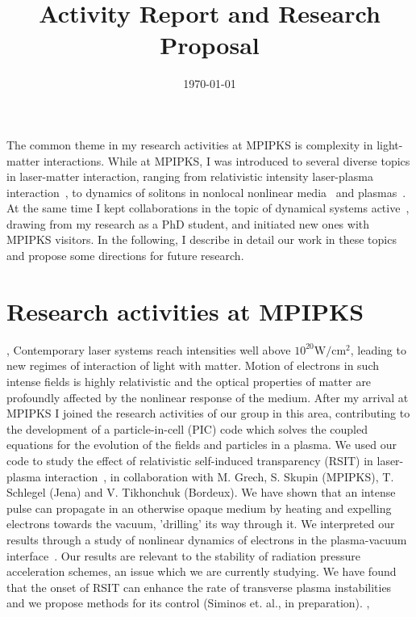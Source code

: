 \documentclass[11pt,a4paper,final]{moderncv}
\title{\large{Activity Report and Research Proposal}}               %
\date{\today}
\begin{document}
\maketitle


The common theme in my research activities at MPIPKS is complexity in light-matter interactions. While at MPIPKS,
I was introduced to several diverse topics in laser-matter interaction,
ranging from relativistic intensity laser-plasma interaction~\cite{siminos2012},
to dynamics of solitons in nonlocal nonlinear media~\cite{maucher2013} and plasmas~\cite{saxena2013}. 
At the same time I kept collaborations in the topic of dynamical systems active~\cite{atlas12}, drawing from
my research as a PhD student, and initiated new ones with MPIPKS visitors.
In the following, I describe in detail our work in these topics and propose some directions
for future research.


\section{Research activities at MPIPKS}
\sep
{}
Contemporary laser systems reach intensities well above $10^{20}\mathrm{W/cm^2}$, 
leading to new regimes of interaction of light with matter. Motion of
electrons in such intense fields is highly relativistic and the optical
properties of matter are profoundly affected by the nonlinear response
of the medium. After my arrival at MPIPKS I joined the research activities of our
group in this area, contributing to the development of a particle-in-cell (PIC) code
which solves the coupled equations for the evolution of the fields and particles in
a plasma. We used our code to study the effect of relativistic self-induced
transparency (RSIT) in laser-plasma interaction~\cite{kaw1970,palaniyappan2012}, 
in collaboration with M. Grech, S. Skupin (MPIPKS),
T. Schlegel (Jena) and V. Tikhonchuk (Bordeux). 
We have shown that an intense pulse 
can propagate in an otherwise opaque medium by heating and expelling electrons towards the vacuum, 
'drilling' its way through it. We interpreted our results through a study of nonlinear 
dynamics of electrons in the plasma-vacuum interface~\cite{siminos2012}. 
Our results are relevant to the stability of radiation pressure acceleration schemes, 
an issue which we are currently studying. We have found that the onset of RSIT can enhance
the rate of transverse plasma instabilities and we propose methods for its control (Siminos et. al., in preparation).
\sep 
\end{document}
